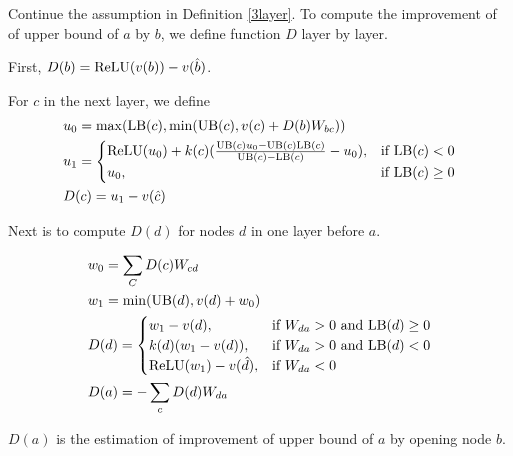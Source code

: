 \begin{definition}
	Continue the assumption in Definition \ref{3layer}. To compute the improvement of of upper bound of $a$ by $b$, we define function $D$ layer by layer.
	
	First, $D(b) = \mathrm{ReLU}(v(b))-v(\hat{b})$.
	
For $c$ in the next layer, we define \begin{align*}
	&u_0 = \max(\mathrm{LB}(c),\min(\mathrm{UB}(c),  v(c)+D(b)W_{bc}))\\
	&u_1 = \begin{cases}
		\mathrm{ReLU}(u_0)+k(c)(\frac{\mathrm{UB}(c)u_0-\mathrm{UB}(c)\mathrm{LB}(c)}{\mathrm{UB}(c)-\mathrm{LB}(c)}-u_0), & \text{if }\mathrm{LB}(c) < 0\\
	u_0, & \text{if }  \mathrm{LB}(c) \geq 0
	\end{cases}\\
	&D(c) = u_1-v(\hat{c})
\end{align*}
	
	Next is to compute $D(d)$ for nodes $d$ in one layer before $a$.
	
	\begin{align*}
		&w_0 = \sum_C D(c)W_{cd}\\
		&w_1 = \min(\mathrm{UB}(d),v(d)+w_0)\\		
		&D(d) =
		\begin{cases}
			w_1-v({d}), & \text{if }W_{da} > 0 \text{ and } \mathrm{LB}(d)\geq 0\\
		k(d)(w_1-v({d})), & \text{if }W_{da} > 0 \text{ and } \mathrm{LB}(d)< 0\\
		\mathrm{ReLU}(w_1)-v(\hat{d})	, & \text{if }  W_{da} < 0
		\end{cases}\\
		&D(a) = -\sum_c D(d)W_{da}
	\end{align*}
\end{definition} $D(a)$ is the estimation of improvement of upper bound of $a$ by opening node $b$. 
		